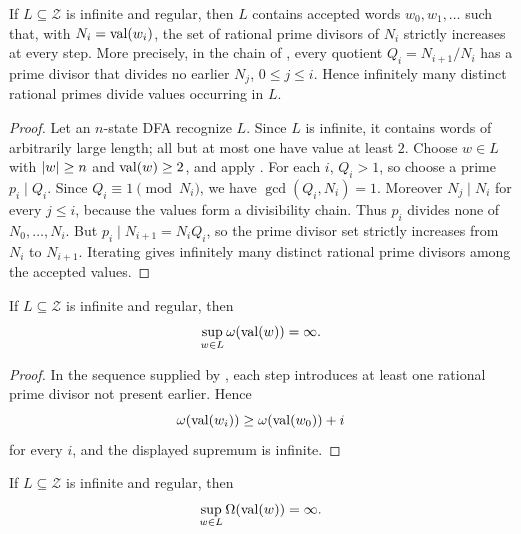 \begin{corollary}
  \label{cor:fresh-rational-primes-in-every-infinite-regular-zeckendorf-language}
  If \(L\subseteq\mathcal Z\) is infinite and regular, then \(L\)
  contains accepted words \(w_0,w_1,\ldots\) such that, with
  \(N_i=\operatorname{val}(w_i)\), the set of rational prime divisors of \(N_i\)
  strictly increases at every step. More precisely, in the chain of
  , every quotient
  \(Q_i=N_{i+1}/N_i\) has a prime divisor that divides no earlier
  \(N_j\), \(0\le j\le i\). Hence infinitely many distinct rational
  primes divide values occurring in \(L\).
\end{corollary}

\begin{proof}
  Let an \(n\)-state DFA recognize \(L\). Since \(L\) is infinite, it
  contains words of arbitrarily large length; all but at most one have
  value at least \(2\). Choose \(w\in L\) with \(\lvert w \rvert\ge n\) and
  \(\operatorname{val}(w)\ge2\), and apply
  . For each \(i\),
  \(Q_i>1\), so choose a prime \(p_i\mid Q_i\). Since
  \(Q_i\equiv1\pmod {N_i}\), we have \(\gcd(Q_i,N_i)=1\). Moreover
  \(N_j\mid N_i\) for every \(j\le i\), because the values form a
  divisibility chain. Thus \(p_i\) divides none of
  \(N_0,\ldots,N_i\). But \(p_i\mid N_{i+1}=N_iQ_i\), so the prime
  divisor set strictly increases from \(N_i\) to \(N_{i+1}\). Iterating
  gives infinitely many distinct rational prime divisors among the
  accepted values.
\end{proof}

\begin{corollary}
  \label{cor:unbounded-distinct-prime-divisors}
  If \(L\subseteq\mathcal Z\) is infinite and regular, then
  \[
    \sup_{w\in L}\omega(\operatorname{val}(w))=\infty .
  \]
\end{corollary}

\begin{proof}
  In the sequence supplied by
  ,
  each step introduces at least one rational prime divisor not present
  earlier. Hence
  \[
    \omega(\operatorname{val}(w_i))\ge \omega(\operatorname{val}(w_0))+i
  \]
  for every \(i\), and the displayed supremum is infinite.
\end{proof}

\begin{corollary}
  \label{cor:unbounded-prime-factor-count-in-infinite-regular-zeckendorf-languages}
  If \(L\subseteq\mathcal Z\) is infinite and regular, then
  \[
    \sup_{w\in L}\Omega(\operatorname{val}(w))=\infty .
  \]
\end{corollary}

